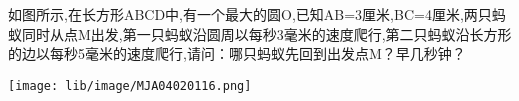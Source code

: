如图所示,在长方形ABCD中,有一个最大的圆O,已知AB=3厘米,BC=4厘米,两只蚂蚁同时从点M出发,第一只蚂蚁沿圆周以每秒3毫米的速度爬行,第二只蚂蚁沿长方形的边以每秒5毫米的速度爬行,请问：哪只蚂蚁先回到出发点M？早几秒钟？

\begin{flushright}

    \texttt{[image: lib/image/MJA04020116.png]}

\end{flushright}



